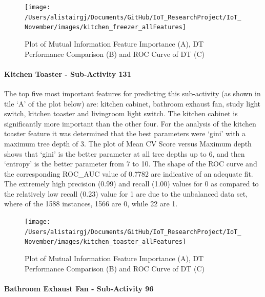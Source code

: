 \documentclass[11pt,]{article}
\let\oldparagraph\paragraph
\renewcommand{\paragraph}[1]{\oldparagraph{#1}\mbox{}}
\begin{document}
\begin{figure}[H]

{\centering \texttt{[image: /Users/alistairgj/Documents/GitHub/IoT\_ResearchProject/IoT\_November/images/kitchen\_freezer\_allFeatures]} 

}

\caption{Plot of Mutual Information Feature Importance (A), DT Performance Comparison (B) and ROC Curve of DT (C)}\label{fig:unnamed-chunk-9}
\end{figure}

\hypertarget{kitchen-toaster---sub-activity-131-1}{%
\paragraph{Kitchen Toaster - Sub-Activity
131}\label{kitchen-toaster---sub-activity-131-1}}

The top five most important features for predicting this sub-activity
(as shown in tile `A' of the plot below) are: kitchen cabinet, bathroom
exhaust fan, study light switch, kitchen toaster and livingroom light
switch. The kitchen cabinet is significantly more important than the
other four. For the analysis of the kitchen toaster feature it was
determined that the best parameters were `gini' with a maximum tree
depth of 3. The plot of Mean CV Score versus Maximum depth shows that
`gini' is the better parameter at all tree depths up to 6, and then
`entropy' is the better parameter from 7 to 10. The shape of the ROC
curve and the corresponding ROC\_AUC value of 0.7782 are indicative of
an adequate fit. The extremely high precision (0.99) and recall (1.00)
values for 0 as compared to the relatively low recall (0.23) value for 1
are due to the unbalanced data set, where of the 1588 instances, 1566
are 0, while 22 are 1.

\begin{figure}[H]

{\centering \texttt{[image: /Users/alistairgj/Documents/GitHub/IoT\_ResearchProject/IoT\_November/images/kitchen\_toaster\_allFeatures]} 

}

\caption{Plot of Mutual Information Feature Importance (A), DT Performance Comparison (B) and ROC Curve of DT (C)}\label{fig:unnamed-chunk-10}
\end{figure}

\hypertarget{bathroom-exhaust-fan---sub-activity-96-1}{%
\paragraph{Bathroom Exhaust Fan - Sub-Activity
96}\label{bathroom-exhaust-fan---sub-activity-96-1}}
\end{document}
